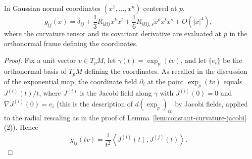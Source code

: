 \begin{lemma}
\label{lem:normal-coordinates-expansion}
In Gaussian normal coordinates $(x^1,\ldots,x^n)$ centered at $p$,
$$g_{ij}(x)=\delta_{ij}+\frac13R_{iklj}x^kx^l
+\frac16R_{iklj,s}x^kx^lx^s+O(|x|^4),$$
where the curvature tensor and its covariant derivative are
evaluated at $p$ in the orthonormal frame defining the coordinates.
\end{lemma}

\begin{proof}
Fix a unit vector $v\in T_pM$, let $\gamma(t)=\exp_p(tv)$, and
let $\{e_i\}$ be the orthonormal basis of $T_pM$ defining the
coordinates. As recalled in the discussion of the exponential map,
the coordinate field $\partial_i$ at the point $\exp_p(tv)$
equals $J^{(i)}(t)/t$, where $J^{(i)}$ is the Jacobi field along
$\gamma$ with $J^{(i)}(0)=0$ and $\nabla J^{(i)}(0)=e_i$ (this is
the description of $d(\exp_p)_{tv}$ by Jacobi fields, applied to
the radial rescaling as in the proof of
Lemma~\ref{lem:constant-curvature-jacobi}(2)). Hence
$$g_{ij}(tv)=\frac{1}{t^2}\left\langle
J^{(i)}(t),J^{(j)}(t)\right\rangle .$$


\end{proof}
